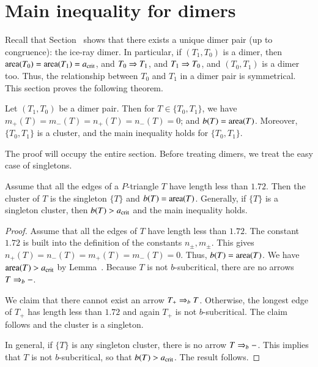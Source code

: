 \section{Main inequality for dimers}

Recall that Section~ shows that there exists a unique
dimer pair (up to congruence): the ice-ray dimer.  In particular, if
$(T_1,T_0)$ is a dimer, then ${\operatorname{area}}(T_0)={\operatorname{area}}(T_1)=a_\text{crit}$, and
$T_0\Rightarrow T_1$, and $T_1\Rightarrow T_0$, and $(T_0,T_1)$ is a dimer too.  Thus,
the relationship between $T_0$ and $T_1$ in a dimer pair is
symmetrical.  This section proves the following theorem.

\begin{theorem} 
  Let $(T_1,T_0)$ be a dimer pair.  Then for $T\in\{T_0,T_1\}$, we have
  $m_+(T)=m_-(T) = n_+(T)=n_-(T) = 0$; and $b(T) = {\operatorname{area}}(T)$.
  Moreover, $\{T_0,T_1\}$ is a cluster, and the main inequality holds
  for $\{T_0,T_1\}$.
\end{theorem}

The proof will occupy the entire section.  Before treating dimers, we
treat the easy case of singletons.

\begin{lemma}  
  Assume that all the edges of a $P$-triangle $T$ have length less
  than $1.72$.  Then the cluster of $T$ is the singleton $\{T\}$ and
  $b(T) ={\operatorname{area}}(T)$.  Generally, if $\{T\}$ is a singleton
  cluster, then $b(T) > a_\text{crit}$ and the main inequality holds.
\end{lemma}

\begin{proof} 
  Assume that all the edges of $T$ have length less than $1.72$.  The
  constant $1.72$ is built into the definition of the constants
  $n_\pm,m_\pm$. This gives $n_+(T)=n_-(T) = m_+(T)=m_-(T)=0$.  Thus,
  $b(T)={\operatorname{area}}(T)$.  We have ${\operatorname{area}}(T) > a_\text{crit}$ by
  Lemma~.  Because $T$ is not $b$-subcritical, there are
  no arrows $T\Rightarrow_{b} -$.

  We claim that there cannot exist an arrow $T_+\Rightarrow_{b} T$.  Otherwise,
  the longest edge of $T_+$ has length less than $1.72$ and again
  $T_+$ is not $b$-subcritical.  The claim follows and the cluster is
  a singleton.

  In general, if $\{T\}$ is any singleton cluster, there is no arrow
  $T\Rightarrow_{b} -$.  This implies that $T$ is not $b$-subcritical, so that
  $b(T) > a_\text{crit}$.  The result follows.
\end{proof}

